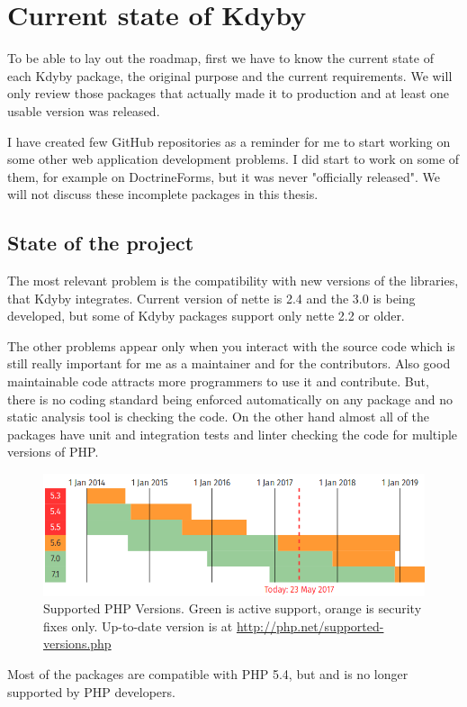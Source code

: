 \chapter{Current state of Kdyby}

To be able to lay out the roadmap, first we have to know the current state of each Kdyby package, the original purpose and the current requirements. We will only review those packages that actually made it to production and at least one usable version was released.

I have created few GitHub repositories as a reminder for me to start working on some other web application development problems. I did start to work on some of them, for example on DoctrineForms, but it was never "officially released". We will not discuss these incomplete packages in this thesis.

\section{State of the project}

The most relevant problem is the compatibility with new versions of the libraries, that Kdyby integrates. Current version of \gls{nette} is 2.4 and the 3.0 is being developed, but some of Kdyby packages support only \gls{nette} 2.2 or older.

The other problems appear only when you interact with the source code which is still really important for me as a maintainer and for the contributors. Also good maintainable code attracts more programmers to use it and contribute. But, there is no coding standard being enforced automatically on any package and no static analysis tool is checking the code. On the other hand almost all of the packages have unit and integration tests and linter checking the code for multiple versions of PHP.

\begin{figure}[h] \label{fig:php:supported-versions}
  \centering
    \includegraphics[width=1\textwidth]{src/assets/php-supported-versions.png}
  \caption{Supported PHP Versions. Green is active support, orange is security fixes only. Up-to-date version is at \url{http://php.net/supported-versions.php}}
\end{figure}
Most of the packages are compatible with PHP 5.4, but  and is no longer supported by PHP developers.

